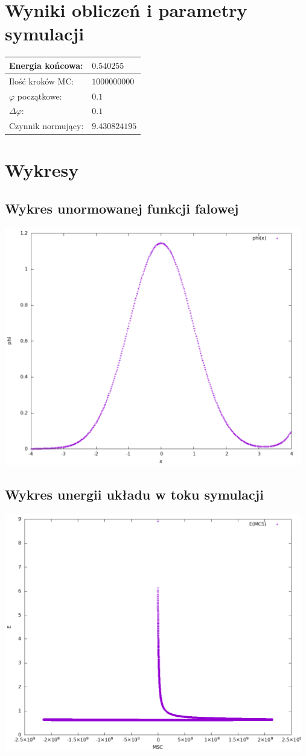 \documentclass{article}
\begin{document}
\newpage
\section{Wyniki obliczeń i parametry symulacji}
\begin{center}
\begin{tabular}{p{5cm}|p{5cm}}
	Energia końcowa: & $0.540255$\\
	\hline
	Ilość kroków MC: & $1 000 000 000$\\
	\hline
	$\varphi$ początkowe: & $0.1$\\
	\hline
	$\Delta \varphi:$ & $0.1$\\
	\hline
	Czynnik normujący: & $9.430824195$\\
\end{tabular}
\end{center}

\section{Wykresy}
\subsection{Wykres unormowanej funkcji falowej}
\includegraphics[width=13cm]{phi.png}

\subsection{Wykres unergii układu w toku symulacji}
\includegraphics[width=13cm]{energy.png}
\end{document}
